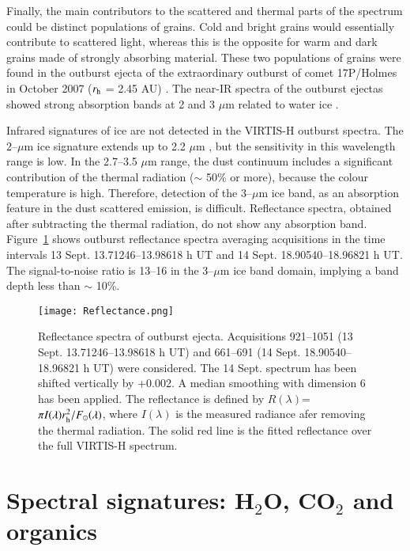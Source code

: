 \documentclass[a4paper,fleqn,usenatbib]{mnras}
\begin{document}
Finally, the main contributors to the scattered and thermal parts of the spectrum could be distinct populations of grains. Cold and bright grains would essentially contribute to scattered light, whereas this is the opposite for warm and dark grains made of strongly absorbing material. These two populations of grains were
found in the outburst ejecta of the extraordinary outburst of comet 17P/Holmes in October 2007 ($r_{\rm h}$ = 2.45 AU) \citep{Yang2009}. The near-IR spectra of 
the outburst ejectas showed strong absorption bands at 2 and 3 $\mu$m related to water ice \citep{Yang2009}.
 

Infrared signatures of ice are not detected in the VIRTIS-H outburst spectra. The 2--$\mu$m ice signature extends up to 2.2 $\mu$m \citep[e.g.,][]{Yang2009}, but the sensitivity in this wavelength range is low. In the 2.7--3.5 $\mu$m range, the dust continuum includes a significant contribution of the thermal radiation ($\sim$ 50\% or more), because the colour temperature is high. Therefore, detection of the 3--$\mu$m ice band, as an absorption feature in the dust scattered emission, is difficult. Reflectance spectra, obtained after subtracting the thermal radiation, do not show any absorption band. Figure~\ref{fig:reflectance} shows outburst reflectance spectra averaging acquisitions in the time intervals 13 Sept. 13.71246--13.98618 h UT and 14 Sept. 18.90540--18.96821 h UT. The signal-to-noise ratio is 13--16 in the 3--$\mu$m ice band domain, implying a band depth less than $\sim$ 10\%. 


   \begin{figure}
    \texttt{[image: Reflectance.png]}
    \caption{Reflectance spectra of outburst ejecta. Acquisitions 921--1051 (13 Sept. 13.71246--13.98618 h UT) and 661--691 (14 Sept.  18.90540--18.96821 h UT) were considered. The 14 Sept. spectrum has been shifted vertically by +0.002. A median smoothing with dimension 6 has been applied. The reflectance is defined by $R(\lambda)$= $\pi I(\lambda) r_{\rm h}^2 /F_{\odot}(\lambda)$, where $I(\lambda)$ is the measured radiance afer removing the thermal radiation. The solid red line is the fitted reflectance over the full VIRTIS-H spectrum. }
    \label{fig:reflectance}
\end{figure}



\section{Spectral signatures: H$_2$O, CO$_2$ and organics}
\label{sec:gas}
\end{document}
